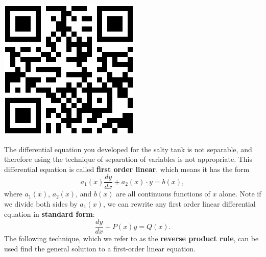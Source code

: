 \vspace{-.5in}\hspace{-.1in}\includegraphics[width=.5in]{06/06SaltyTankQR.png}
\vfill

\clearpage
 
The differential equation you developed for the salty tank is not separable, and therefore using the technique of separation of variables is not appropriate. This differential equation is  called \textbf{first order linear}, which means it has the form 
\[ a_1(x) \frac{dy}{dx}+ a_2(x) \cdot y=b(x),\]
where $a_1(x)$, $a_2(x)$, and $b(x)$ are all continuous functions of $x$ alone.
\vs
Note if we divide both sides by $a_1(x)$, we can rewrite any first order linear differential equation in \textbf{standard form}:
\[ \frac{dy}{dx} + P(x)y = Q(x).\]
\vs
The following technique, which we refer to as the \textbf{reverse product rule}, can be used find the general solution to a first-order linear equation.

